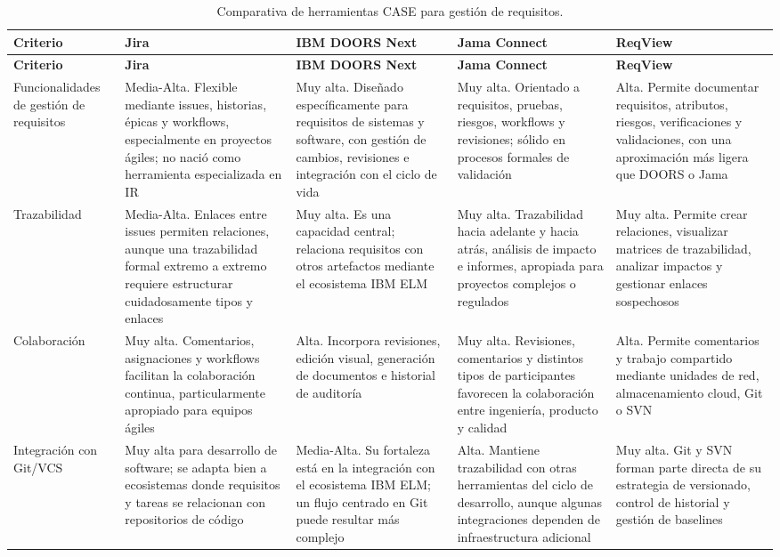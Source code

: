 \documentclass[journal,onecolumn]{IEEEtran}
\begin{document}
	\begin{longtable}{@{}p{2.1cm} p{2.6cm} p{2.6cm} p{2.6cm} p{2.6cm}@{}}
		\caption{Comparativa de herramientas CASE para gestión de requisitos.}
		\label{tab:comparativa-case} \\
		\toprule
		\textbf{Criterio} & \textbf{Jira} & \textbf{IBM DOORS Next} & \textbf{Jama Connect} & \textbf{ReqView} \\
		\midrule
		\endfirsthead
		\toprule
		\textbf{Criterio} & \textbf{Jira} & \textbf{IBM DOORS Next} & \textbf{Jama Connect} & \textbf{ReqView} \\
		\midrule
		\endhead
		Funcionalidades de gestión de requisitos & Media-Alta. Flexible mediante issues, historias, épicas y workflows, especialmente en proyectos ágiles; no nació como herramienta especializada en IR & Muy alta. Diseñado específicamente para requisitos de sistemas y software, con gestión de cambios, revisiones e integración con el ciclo de vida \cite{IBM2023} & Muy alta. Orientado a requisitos, pruebas, riesgos, workflows y revisiones; sólido en procesos formales de validación \cite{JamaSoftware2026} & Alta. Permite documentar requisitos, atributos, riesgos, verificaciones y validaciones, con una aproximación más ligera que DOORS o Jama \cite{ReqView2026} \\
		Trazabilidad & Media-Alta. Enlaces entre issues permiten relaciones, aunque una trazabilidad formal extremo a extremo requiere estructurar cuidadosamente tipos y enlaces & Muy alta. Es una capacidad central; relaciona requisitos con otros artefactos mediante el ecosistema IBM ELM \cite{IBM2023} & Muy alta. Trazabilidad hacia adelante y hacia atrás, análisis de impacto e informes, apropiada para proyectos complejos o regulados \cite{JamaSoftwareTraceability2026} & Muy alta. Permite crear relaciones, visualizar matrices de trazabilidad, analizar impactos y gestionar enlaces sospechosos \cite{ReqView2026} \\
		Colaboración & Muy alta. Comentarios, asignaciones y workflows facilitan la colaboración continua, particularmente apropiado para equipos ágiles & Alta. Incorpora revisiones, edición visual, generación de documentos e historial de auditoría \cite{IBM2023} & Muy alta. Revisiones, comentarios y distintos tipos de participantes favorecen la colaboración entre ingeniería, producto y calidad \cite{JamaSoftware2026} & Alta. Permite comentarios y trabajo compartido mediante unidades de red, almacenamiento cloud, Git o SVN \cite{ReqView2026} \\
		Integración con Git/VCS & Muy alta para desarrollo de software; se adapta bien a ecosistemas donde requisitos y tareas se relacionan con repositorios de código & Media-Alta. Su fortaleza está en la integración con el ecosistema IBM ELM; un flujo centrado en Git puede resultar más complejo & Alta. Mantiene trazabilidad con otras herramientas del ciclo de desarrollo, aunque algunas integraciones dependen de infraestructura adicional & Muy alta. Git y SVN forman parte directa de su estrategia de versionado, control de historial y gestión de baselines \cite{ReqView2026} \\

\end{longtable}
\end{document}
